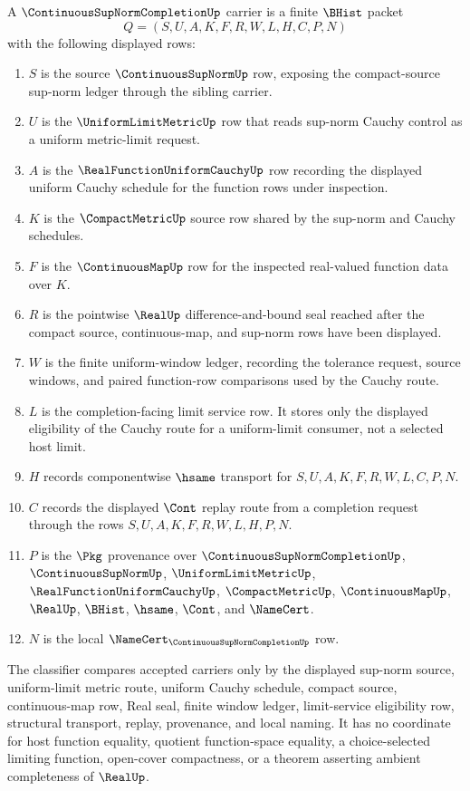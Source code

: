 \begin{definition}
\label{def:continuous-supnorm-completion-carrier}
A $\ContinuousSupNormCompletionUp$ carrier is a finite $\BHist$ packet
$$
Q=(S,U,A,K,F,R,W,L,H,C,P,N)
$$
with the following displayed rows:
\begin{enumerate}
\item $S$ is the source $\ContinuousSupNormUp$ row, exposing the compact-source sup-norm ledger through the sibling carrier.
\item $U$ is the $\UniformLimitMetricUp$ row that reads sup-norm Cauchy control as a uniform metric-limit request.
\item $A$ is the $\RealFunctionUniformCauchyUp$ row recording the displayed uniform Cauchy schedule for the function rows under inspection.
\item $K$ is the $\CompactMetricUp$ source row shared by the sup-norm and Cauchy schedules.
\item $F$ is the $\ContinuousMapUp$ row for the inspected real-valued function data over $K$.
\item $R$ is the pointwise $\RealUp$ difference-and-bound seal reached after the compact source, continuous-map, and sup-norm rows have been displayed.
\item $W$ is the finite uniform-window ledger, recording the tolerance request, source windows, and paired function-row comparisons used by the Cauchy route.
\item $L$ is the completion-facing limit service row. It stores only the displayed eligibility of the Cauchy route for a uniform-limit consumer, not a selected host limit.
\item $H$ records componentwise $\hsame$ transport for $S,U,A,K,F,R,W,L,C,P,N$.
\item $C$ records the displayed $\Cont$ replay route from a completion request through the rows $S,U,A,K,F,R,W,L,H,P,N$.
\item $P$ is the $\Pkg$ provenance over $\ContinuousSupNormCompletionUp$, $\ContinuousSupNormUp$, $\UniformLimitMetricUp$, $\RealFunctionUniformCauchyUp$, $\CompactMetricUp$, $\ContinuousMapUp$, $\RealUp$, $\BHist$, $\hsame$, $\Cont$, and $\NameCert$.
\item $N$ is the local $\NameCert_{\ContinuousSupNormCompletionUp}$ row.
\end{enumerate}
The classifier compares accepted carriers only by the displayed sup-norm source, uniform-limit metric route, uniform Cauchy schedule, compact source, continuous-map row, Real seal, finite window ledger, limit-service eligibility row, structural transport, replay, provenance, and local naming. It has no coordinate for host function equality, quotient function-space equality, a choice-selected limiting function, open-cover compactness, or a theorem asserting ambient completeness of $\RealUp$.
\end{definition}

